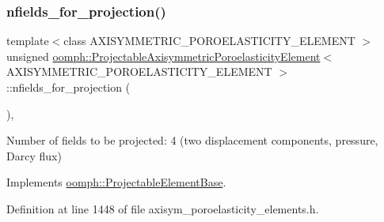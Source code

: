 \subsubsection{\texorpdfstring{nfields\+\_\+for\+\_\+projection()}{nfields\_for\_projection()}}
{\footnotesize\ttfamily template$<$class A\+X\+I\+S\+Y\+M\+M\+E\+T\+R\+I\+C\+\_\+\+P\+O\+R\+O\+E\+L\+A\+S\+T\+I\+C\+I\+T\+Y\+\_\+\+E\+L\+E\+M\+E\+NT $>$ \\
unsigned \hyperlink{classoomph_1_1ProjectableAxisymmetricPoroelasticityElement}{oomph\+::\+Projectable\+Axisymmetric\+Poroelasticity\+Element}$<$ A\+X\+I\+S\+Y\+M\+M\+E\+T\+R\+I\+C\+\_\+\+P\+O\+R\+O\+E\+L\+A\+S\+T\+I\+C\+I\+T\+Y\+\_\+\+E\+L\+E\+M\+E\+NT $>$\+::nfields\+\_\+for\+\_\+projection (\begin{DoxyParamCaption}{ }\end{DoxyParamCaption})\hspace{0.3cm}{\ttfamily [inline]}, {\ttfamily [virtual]}}



Number of fields to be projected\+: 4 (two displacement components, pressure, Darcy flux) 



Implements \hyperlink{classoomph_1_1ProjectableElementBase_a44634aa4049332a580d249c25564638c}{oomph\+::\+Projectable\+Element\+Base}.



Definition at line 1448 of file axisym\+\_\+poroelasticity\+\_\+elements.\+h.

\mbox{\label{classoomph_1_1ProjectableAxisymmetricPoroelasticityElement_a077bea222dd174803e3af28e6995195e}} 
